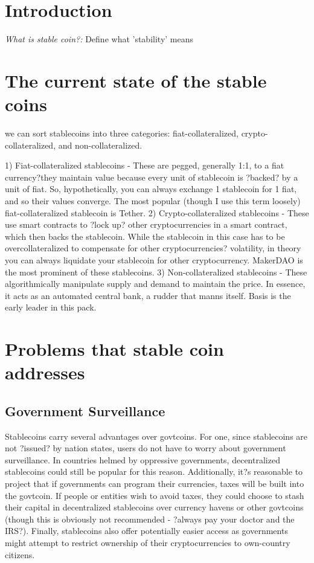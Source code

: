 \section{Introduction}

\textit{What is stable coin?:}
Define what 'stability' means


\section{The current state of the stable coins} %

we can sort stablecoins into three categories: fiat-collateralized, crypto-collateralized, and non-collateralized.

1) Fiat-collateralized stablecoins - These are pegged, generally 1:1, to a fiat currency?they maintain value because every unit of stablecoin is ?backed? by a unit of fiat. So, hypothetically, you can always exchange 1 stablecoin for 1 fiat, and so their values converge. The most popular (though I use this term loosely) fiat-collateralized stablecoin is Tether.
2) Crypto-collateralized stablecoins - These use smart contracts to ?lock up? other cryptocurrencies in a smart contract, which then backs the stablecoin. While the stablecoin in this case has to be overcollateralized to compensate for other cryptocurrencies? volatility, in theory you can always liquidate your stablecoin for other cryptocurrency. MakerDAO is the most prominent of these stablecoins.
3) Non-collateralized stablecoins - These algorithmically manipulate supply and demand to maintain the price. In essence, it acts as an automated central bank, a rudder that manns itself. Basis is the early leader in this pack.





\section{Problems that stable coin addresses}

\subsection{Government Surveillance}
Stablecoins carry several advantages over govtcoins. For one, since stablecoins are not ?issued? by nation states, users do not have to worry about government surveillance. In countries helmed by oppressive governments, decentralized stablecoins could still be popular for this reason. Additionally, it?s reasonable to project that if governments can program their currencies, taxes will be built into the govtcoin. If people or entities wish to avoid taxes, they could choose to stash their capital in decentralized stablecoins over currency havens or other govtcoins (though this is obviously not recommended - ?always pay your doctor and the IRS?). Finally, stablecoins also offer potentially easier access as governments might attempt to restrict ownership of their cryptocurrencies to own-country citizens.

